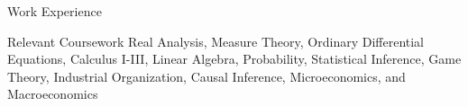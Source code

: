 \documentclass{resume} %
\begin{document}
\begin{rSection}{Work Experience}
\end{rSection}




\begin{rSection}{Relevant Coursework}
  Real Analysis, Measure Theory, Ordinary Differential Equations, Calculus I-III, Linear Algebra, Probability, Statistical Inference, Game Theory, Industrial Organization, Causal Inference, Microeconomics, and Macroeconomics
\end{rSection}


\end{document}
